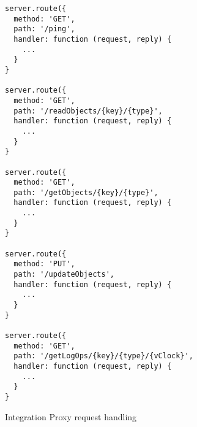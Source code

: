 \begin{lstlisting}[caption={Integration proxy API},label={lst:proxy_api}]
server.route({
  method: 'GET',
  path: '/ping',
  handler: function (request, reply) {
    ...
  }
}

server.route({
  method: 'GET',
  path: '/readObjects/{key}/{type}',
  handler: function (request, reply) {
    ...
  }
}

server.route({
  method: 'GET',
  path: '/getObjects/{key}/{type}',
  handler: function (request, reply) {
    ...
  }
}

server.route({
  method: 'PUT',
  path: '/updateObjects',
  handler: function (request, reply) {
    ...
  }
}

server.route({
  method: 'GET',
  path: '/getLogOps/{key}/{type}/{vClock}',
  handler: function (request, reply) {
    ...
  }
}
\end{lstlisting}

\begin{algorithm}
\caption{Integration Proxy request handling}
\label{integration_proxy_algorithm}
\begin{algorithmic}[1]
      \End
      \End
    \End
    \End
    \End
  \End
\End
\end{algorithmic}
\end{algorithm}




